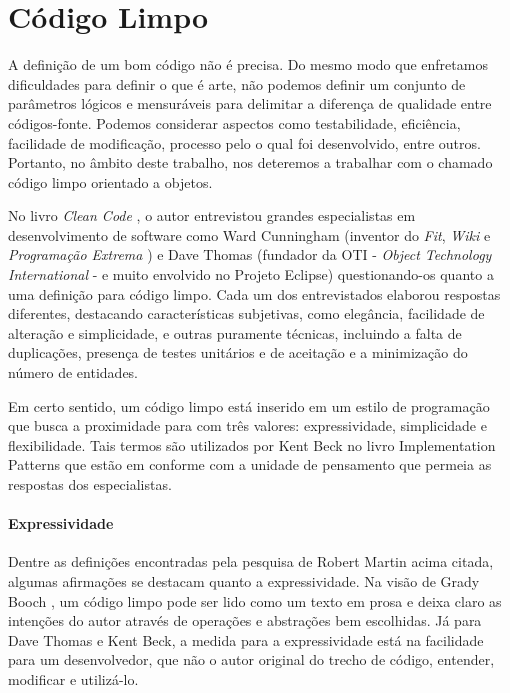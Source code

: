 \chapter{Código Limpo}
\label{chap:codigo_limpo}

A definição de um bom código não é precisa. Do mesmo modo que enfretamos dificuldades para definir o que é arte, não podemos definir um conjunto de parâmetros lógicos e mensuráveis para delimitar a diferença de qualidade entre códigos-fonte. Podemos considerar aspectos como testabilidade, eficiência, facilidade de modificação, processo pelo o qual foi desenvolvido, entre outros. Portanto, no âmbito deste trabalho, nos deteremos a trabalhar com o chamado código limpo orientado a objetos.

No livro \textit{Clean Code} \citep{Martin2008}, o autor entrevistou grandes especialistas em desenvolvimento de software como Ward Cunningham (inventor do \textit{Fit}, \textit{Wiki} e \textit{Programação Extrema} \citep{Beck1999}) e Dave Thomas (fundador da OTI - \textit{Object Technology International} - e muito envolvido no Projeto Eclipse) questionando-os quanto a uma definição para código limpo. Cada um dos entrevistados elaborou respostas diferentes, destacando características subjetivas, como elegância, facilidade de alteração e simplicidade, e outras puramente técnicas, incluindo a falta de duplicações, presença de testes unitários e de aceitação e a minimização do número de entidades.

Em certo sentido, um código limpo está inserido em um estilo de programação que busca a proximidade para com três valores: expressividade, simplicidade e flexibilidade. Tais termos são utilizados por Kent Beck no livro Implementation Patterns \citep{Beck2007} que estão em conforme com a unidade de pensamento que permeia as respostas dos especialistas.

\subsubsection{Expressividade}
Dentre as definições encontradas pela pesquisa de Robert Martin acima citada, algumas afirmações se destacam quanto a expressividade. Na visão de Grady Booch \citep{Booch2007}, um código limpo pode ser lido como um texto em prosa e deixa claro as intenções do autor através de operações e abstrações bem escolhidas. Já para Dave Thomas e Kent Beck, a medida para a expressividade está na facilidade para um desenvolvedor, que não o autor original do trecho de código, entender, modificar e utilizá-lo.

